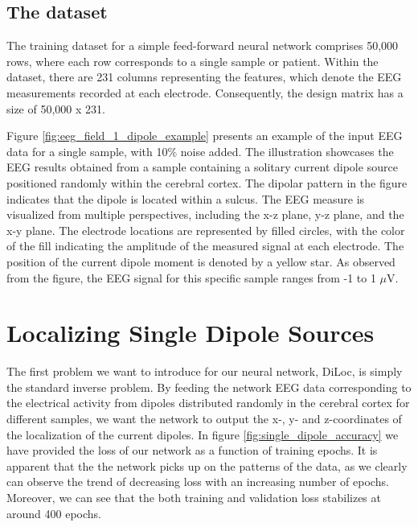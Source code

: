 \documentclass[a4paper, UKenglish, 11pt]{uiomaster}
\begin{document}
\subsection{The dataset}
The training dataset for a simple feed-forward neural network comprises 50,000 rows, where each row corresponds to a single sample or patient. Within the dataset, there are 231 columns representing the features, which denote the EEG measurements recorded at each electrode. Consequently, the design matrix has a size of 50,000 x 231.

Figure \ref{fig:eeg_field_1_dipole_example} presents an example of the input EEG data for a single sample, with 10$\%$ noise added. The illustration showcases the EEG results obtained from a sample containing a solitary current dipole source positioned randomly within the cerebral cortex. The dipolar pattern in the figure indicates that the dipole is located within a sulcus. The EEG measure is visualized from multiple perspectives, including the x-z plane, y-z plane, and the x-y plane. The electrode locations are represented by filled circles, with the color of the fill indicating the amplitude of the measured signal at each electrode. The position of the current dipole moment is denoted by a yellow star. As observed from the figure, the EEG signal for this specific sample ranges from -1 to 1 $\mu$V.


\section{Localizing Single Dipole Sources}



The first problem we want to introduce for our neural network, DiLoc, is simply the standard inverse problem. By feeding the network EEG data corresponding to the electrical activity from dipoles distributed randomly in the cerebral cortex for different samples, we want the network to output the x-, y- and z-coordinates of the localization of the current dipoles. In figure \ref{fig:single_dipole_accuracy} we have provided the loss of our network as a function of training epochs. It is apparent that the the network picks up on the patterns of the data, as we clearly can observe the trend of decreasing loss with an increasing number of epochs. Moreover, we can see that the both training and validation loss stabilizes at around 400 epochs.
\end{document}
